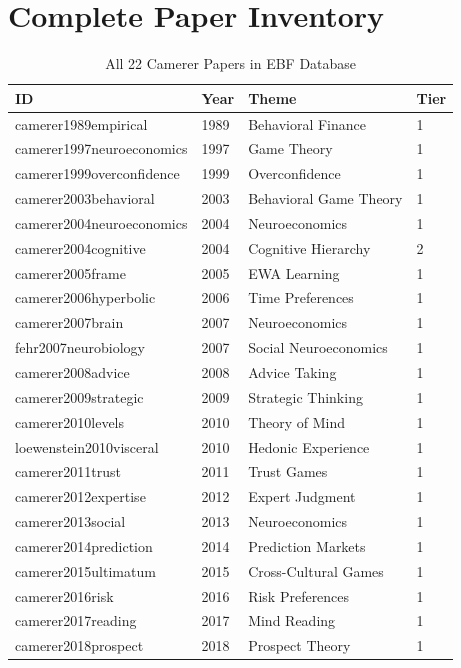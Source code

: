\section{Complete Paper Inventory}
\label{sec:ca-papers}

\begin{table}[htbp]
\centering
\caption{All 22 Camerer Papers in EBF Database}
\label{tab:ca-papers}
\renewcommand{\arraystretch}{1.2}
\scriptsize
\begin{tabular}{@{}llll@{}}
\toprule
\textbf{ID} & \textbf{Year} & \textbf{Theme} & \textbf{Tier} \\
\midrule
camerer1989empirical & 1989 & Behavioral Finance & 1 \\
camerer1997neuroeconomics & 1997 & Game Theory & 1 \\
camerer1999overconfidence & 1999 & Overconfidence & 1 \\
camerer2003behavioral & 2003 & Behavioral Game Theory & 1 \\
camerer2004neuroeconomics & 2004 & Neuroeconomics & 1 \\
camerer2004cognitive & 2004 & Cognitive Hierarchy & 2 \\
camerer2005frame & 2005 & EWA Learning & 1 \\
camerer2006hyperbolic & 2006 & Time Preferences & 1 \\
camerer2007brain & 2007 & Neuroeconomics & 1 \\
fehr2007neurobiology & 2007 & Social Neuroeconomics & 1 \\
camerer2008advice & 2008 & Advice Taking & 1 \\
camerer2009strategic & 2009 & Strategic Thinking & 1 \\
camerer2010levels & 2010 & Theory of Mind & 1 \\
loewenstein2010visceral & 2010 & Hedonic Experience & 1 \\
camerer2011trust & 2011 & Trust Games & 1 \\
camerer2012expertise & 2012 & Expert Judgment & 1 \\
camerer2013social & 2013 & Neuroeconomics & 1 \\
camerer2014prediction & 2014 & Prediction Markets & 1 \\
camerer2015ultimatum & 2015 & Cross-Cultural Games & 1 \\
camerer2016risk & 2016 & Risk Preferences & 1 \\
camerer2017reading & 2017 & Mind Reading & 1 \\
camerer2018prospect & 2018 & Prospect Theory & 1 \\
\bottomrule
\end{tabular}
\end{table}


